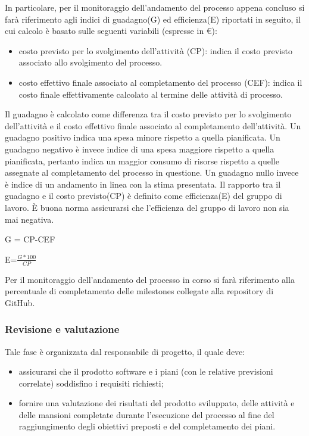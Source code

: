 In particolare, per il monitoraggio dell'andamento del processo appena concluso si farà riferimento agli indici di guadagno(G) ed efficienza(E) riportati in seguito, il cui calcolo è basato sulle seguenti variabili (espresse in €):
\begin{itemize}
    \item costo previsto per lo svolgimento dell'attività (CP): indica il costo previsto associato allo svolgimento del processo.
    \item costo effettivo finale associato al completamento del processo (CEF): indica il costo finale effettivamente calcolato al termine delle attività di processo.
\end{itemize}
Il guadagno è calcolato come differenza tra il costo previsto per lo svolgimento dell'attività e il costo effettivo finale associato al completamento dell'attività. Un guadagno positivo indica una spesa minore rispetto a quella pianificata. Un guadagno negativo è invece indice di una spesa maggiore rispetto a quella pianificata, pertanto indica un maggior consumo di risorse rispetto a quelle assegnate al completamento del processo in questione. Un guadagno nullo invece è indice di un andamento in linea con la stima presentata. Il rapporto tra il guadagno e il costo previsto(CP) è definito come efficienza(E) del gruppo di lavoro. È buona norma assicurarsi che l'efficienza del gruppo di lavoro non sia mai negativa.
\begin{center}
    G = CP-CEF

    E=$\frac{G*100}{CP}$   
\end{center}


Per il monitoraggio dell'andamento del processo in corso si farà riferimento alla percentuale di completamento delle  milestones collegate alla repository di GitHub.

\subsubsection{Revisione e valutazione}
Tale fase è organizzata dal responsabile di progetto, il quale deve:
\begin{itemize}
    \item  assicurarsi che il prodotto software e i piani (con le relative previsioni correlate) soddisfino i requisiti richiesti;
    \item  fornire una valutazione dei risultati del prodotto sviluppato, delle attività e delle mansioni completate durante l'esecuzione del processo al fine del raggiungimento degli obiettivi preposti e del completamento dei piani.
\end{itemize}

